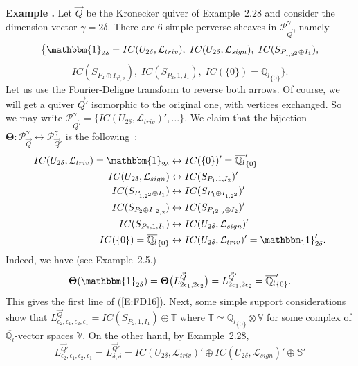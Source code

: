 \documentclass[a4paper,10pt]{amsart}
\def\qlb{\overline{\mathbb{Q}_l}}
\def\FD{\boldsymbol{\Theta}}
\numberwithin{equation}{section}
\begin{document}
\vspace{.2in}

\addtocounter{theo}{1}
\noindent \textbf{Example \thetheo .} Let $\vec{Q}$ be the Kronecker quiver of Example~2.28 and consider the dimension vector $\gamma=2\delta$. There are $6$ simple perverse sheaves in $\mathcal{P}^{\gamma}_{\vec{Q}}$, namely
$$\big\{\mathbbm{1}_{2\delta}=IC(U_{2\delta},\mathcal{L}_{triv}), \; IC(U_{2\delta},\mathcal{L}_{sign}),\; IC(S_{P_{1,2^2}\oplus I_1}),$$
$$IC(S_{P_2 \oplus I_{1^2,2}}),\; IC(S_{P_2,1,I_1}),\; IC(\{0\})=\qlb_{\{0\}}\big\}.$$
Let us use the Fourier-Deligne transform to reverse both arrows. Of course, we will get a quiver $\vec{Q}'$ isomorphic to the original one, with vertices exchanged. So we may write $\mathcal{P}^{\gamma}_{\vec{Q}'}=\big\{ IC(U_{2\delta},\mathcal{L}_{triv})', \ldots\big\}$.
We claim that the bijection $\FD: \mathcal{P}^{\gamma}_{\vec{Q}} \leftrightarrow \mathcal{P}_{\vec{Q}'}^{\gamma}$ is the following~:
\begin{equation}\label{E:FD16}
\begin{split}
IC(U_{2\delta},\mathcal{L}_{triv})=\mathbbm{1}_{2\delta} &\leftrightarrow IC(\{0\})'=\qlb_{\{0\}}'\\
IC(U_{2\delta},\mathcal{L}_{sign}) &\leftrightarrow IC(S_{P_1,1,I_2})'\\
IC(S_{P_{1,2^2} \oplus I_1}) &\leftrightarrow IC(S_{P_1 \oplus I_{1,2^2}})'\\
IC(S_{P_{2} \oplus I_{1^2,2}}) &\leftrightarrow IC(S_{P_{1^2,2} \oplus I_{2}})'\\
IC(S_{P_2,1,I_1}) &\leftrightarrow IC(U_{2\delta},\mathcal{L}_{sign})'\\
IC(\{0\})=\qlb_{\{0\}} &\leftrightarrow IC(U_{2\delta},\mathcal{L}_{triv})'=\mathbbm{1}_{2\delta}'.
\end{split}
\end{equation}
Indeed, we have (see Example~2.5.) 
$$\FD(\mathbbm{1}_{2\delta})=\FD\big(L^{\vec{Q}}_{2\epsilon_1,2\epsilon_2}\big)=L^{\vec{Q}'}_{2\epsilon_1,2\epsilon_2}=\qlb_{\{0\}}'.$$
This gives the first line of (\ref{E:FD16}). Next, some simple support considerations show that $L^{\vec{Q}}_{\epsilon_2,\epsilon_1,\epsilon_2,\epsilon_1} =IC(S_{P_2,1,I_1}) \oplus \mathbb{T}$ where $\mathbb{T} \simeq \qlb_{\{0\}} \otimes \mathbb{V}$ for some complex of $\qlb$-vector spaces $\mathbb{V}$. On the other hand, by Example~2.28,
$$L^{\vec{Q}'}_{\epsilon_2,\epsilon_1,\epsilon_2,\epsilon_1}=L^{\vec{Q}'}_{\delta,\delta}=IC(U_{2\delta},\mathcal{L}_{triv})' \oplus IC(U_{2\delta},\mathcal{L}_{sign})' \oplus \mathbb{S}'$$
\end{document}
